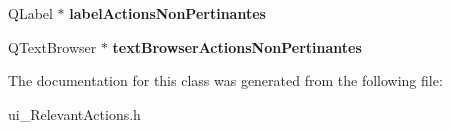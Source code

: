 \begin{DoxyCompactItemize}
\item 
\hypertarget{class_ui___relevant_actions_a080daebce8c51e9f5966206ac8987bd2}{Q\-Label $\ast$ {\bfseries label\-Actions\-Non\-Pertinantes}}\label{class_ui___relevant_actions_a080daebce8c51e9f5966206ac8987bd2}

\item 
\hypertarget{class_ui___relevant_actions_a59127ef0c7d1b292bd0a9ba8ad536462}{Q\-Text\-Browser $\ast$ {\bfseries text\-Browser\-Actions\-Non\-Pertinantes}}\label{class_ui___relevant_actions_a59127ef0c7d1b292bd0a9ba8ad536462}

\end{DoxyCompactItemize}


The documentation for this class was generated from the following file\-:\begin{DoxyCompactItemize}
\item 
ui\-\_\-\-Relevant\-Actions.\-h\end{DoxyCompactItemize}
